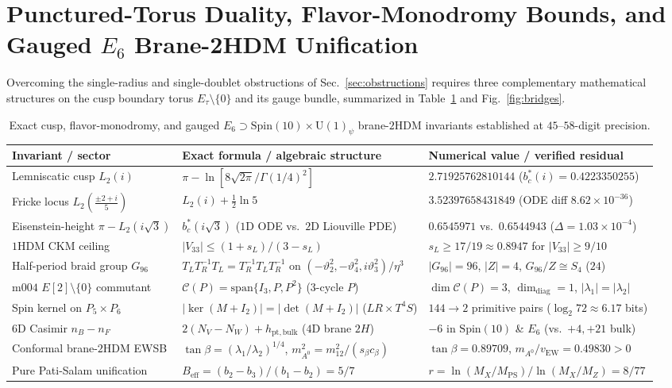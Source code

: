 \documentclass[aps,prd,twocolumn,nofootinbib,floatfix]{revtex4-2}
\begin{document}
\section{Punctured-Torus Duality, Flavor-Monodromy Bounds, and Gauged $E_6$ Brane-2HDM Unification}
\label{sec:bridges}

Overcoming the single-radius and single-doublet obstructions of Sec.~\ref{sec:obstructions} requires three complementary mathematical structures on the cusp boundary torus $E_\tau\setminus\{0\}$ and its gauge bundle, summarized in Table~\ref{tab:bridges} and Fig.~\ref{fig:bridges}.

\begin{table}[t]
\caption{Exact cusp, flavor-monodromy, and gauged $E_6 \supset \mathrm{Spin}(10)\times\mathrm{U}(1)_\psi$ brane-$2\mathrm{HDM}$ invariants established at $45$--$58$-digit precision.}
\label{tab:bridges}
\begin{ruledtabular}
\begin{tabular}{lll}
Invariant / sector & Exact formula / algebraic structure & Numerical value / verified residual \\
\hline
Lemniscatic cusp $L_2(i)$ & $\pi - \ln[8\sqrt{2\pi}/\Gamma(1/4)^2]$ & $2.71925762810144$ ($b_c^*(i) = 0.4223350255$) \\
Fricke locus $L_2(\frac{\pm 2+i}{5})$ & $L_2(i) + \frac{1}{2}\ln 5$ & $3.52397658431849$ (ODE diff $8.62\times 10^{-36}$) \\
Eisenstein-height $\pi - L_2(i\sqrt{3})$ & $b_c^*(i\sqrt{3})$ ($1\mathrm{D}$ ODE vs.\ $2\mathrm{D}$ Liouville PDE) & $0.6545971$ vs.\ $0.6544943$ ($\Delta = 1.03\times 10^{-4}$) \\
$1\mathrm{HDM}$ CKM ceiling & $|V_{33}| \le (1+s_L)/(3-s_L)$ & $s_L \ge 17/19 \approx 0.8947$ for $|V_{33}| \ge 9/10$ \\
Half-period braid group $G_{96}$ & $T_L T_R^{-1} T_L = T_R^{-1} T_L T_R^{-1}$ on $(-\vartheta_2^2,-\vartheta_4^2,i\vartheta_3^2)/\eta^3$ & $|G_{96}| = 96$, $|Z| = 4$, $G_{96}/Z \cong S_4$ ($24$) \\
$\mathrm{m004}$ $E[2]\setminus\{0\}$ commutant & $\mathcal{C}(P) = \mathrm{span}\{I_3, P, P^2\}$ ($3$-cycle $P$) & $\dim\mathcal{C}(P) = 3$, $\dim_{\mathrm{diag}} = 1$, $|\lambda_1|=|\lambda_2|$ \\
Spin kernel on $P_5 \times P_6$ & $|\ker(M + I_2)| = |\det(M + I_2)|$ ($LR \times T^4 S$) & $144 \to 2$ primitive pairs ($\log_2 72 \approx 6.17$ bits) \\
$6\mathrm{D}$ Casimir $n_B - n_F$ & $2(N_V - N_W) + h_{\mathrm{pt,bulk}}$ ($4\mathrm{D}$ brane $2H$) & $-6$ in $\mathrm{Spin}(10)$ \& $E_6$ (vs.\ $+4, +21$ bulk) \\
Conformal brane-$2\mathrm{HDM}$ EWSB & $\tan\beta = (\lambda_1/\lambda_2)^{1/4}$, $m_{A^0}^2 = m_{12}^2/(s_\beta c_\beta)$ & $\tan\beta = 0.89709$, $m_{A^0}/v_{\mathrm{EW}} = 0.49830 > 0$ \\
Pure Pati-Salam unification & $B_{\mathrm{eff}} = (b_2 - b_3)/(b_1 - b_2) = 5/7$ & $r = \ln(M_X/M_{\mathrm{PS}})/\ln(M_X/M_Z) = 8/77$ \\
\end{tabular}
\end{ruledtabular}
\end{table}
\end{document}
